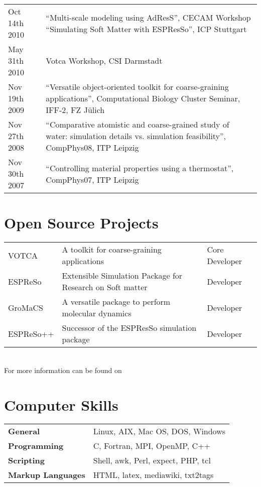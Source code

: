 \documentclass{article}
\begin{document}
\begin{tabular}{p{}p{}}
Oct 14th 2010 & ``Multi-scale modeling using AdResS'', CECAM Workshop ``Simulating Soft Matter with ESPResSo'', ICP Stuttgart\\
May 31th 2010 & Votca Workshop, CSI Darmstadt \\
Nov 19th 2009 & ``Versatile object-oriented toolkit for coarse-graining applications'', Computational Biology Cluster Seminar, IFF-2, FZ J{\"u}lich\\
Nov 27th 2008 & ``Comparative atomistic and coarse-grained study of water: simulation details vs. simulation feasibility'', CompPhys08, ITP Leipzig\\
Nov 30th 2007 & ``Controlling material properties using a thermostat'', CompPhys07, ITP Leipzig\\
\end{tabular}

\section*{Open Source Projects}

\begin{tabular}{p{}p{}p{}}
VOTCA & A toolkit for coarse-graining applications & Core Developer \\
ESPReSo & Extensible Simulation Package for Research on Soft matter & Developer \\
GroMaCS & A versatile package to perform molecular dynamics & Developer \\
ESPReSo++ & Successor of the ESPResSo simulation package & Developer \\
\end{tabular}\\

For more information can be found on 


\section*{Computer Skills}

\begin{tabular}{ll}
\textbf{General} & Linux, AIX, Mac OS, DOS, Windows \\
\textbf{Programming} & C, Fortran, MPI, OpenMP, C++ \\
\textbf{Scripting} & Shell, awk, Perl, expect, PHP, tcl \\
\textbf{Markup Languages} & HTML, latex, mediawiki, txt2tags \\
\end{tabular}
\end{document}
